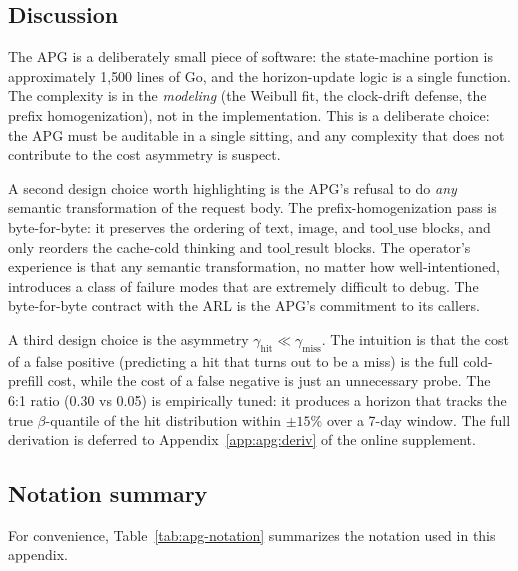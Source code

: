 \subsection{Discussion}
\label{app:apg:disc}

The APG is a deliberately small piece of software: the
state-machine portion is approximately 1{,}500 lines of Go, and the
horizon-update logic is a single function. The complexity is in
the \emph{modeling} (the Weibull fit, the clock-drift defense, the
prefix homogenization), not in the implementation. This is a
deliberate choice: the APG must be auditable in a single sitting,
and any complexity that does not contribute to the cost
asymmetry is suspect.

A second design choice worth highlighting is the APG's refusal to
do \emph{any} semantic transformation of the request body. The
prefix-homogenization pass is byte-for-byte: it preserves the
ordering of $\mathrm{text}$, $\mathrm{image}$, and
$\mathrm{tool\_use}$ blocks, and only reorders the cache-cold
$\mathrm{thinking}$ and $\mathrm{tool\_result}$ blocks. The
operator's experience is that any semantic transformation, no
matter how well-intentioned, introduces a class of failure modes
that are extremely difficult to debug. The byte-for-byte contract
with the ARL is the APG's commitment to its callers.

A third design choice is the asymmetry $\gamma_{\text{hit}} \ll
\gamma_{\text{miss}}$. The intuition is that the cost of a false
positive (predicting a hit that turns out to be a miss) is the
full cold-prefill cost, while the cost of a false negative is just
an unnecessary probe. The 6:1 ratio (0.30 vs 0.05) is empirically
tuned: it produces a horizon that tracks the true
$\beta$-quantile of the hit distribution within $\pm 15\%$ over a
7-day window. The full derivation is deferred to
Appendix~\ref{app:apg:deriv} of the online supplement.

\subsection{Notation summary}
\label{app:apg:notation}

For convenience, Table~\ref{tab:apg-notation} summarizes the
notation used in this appendix.

